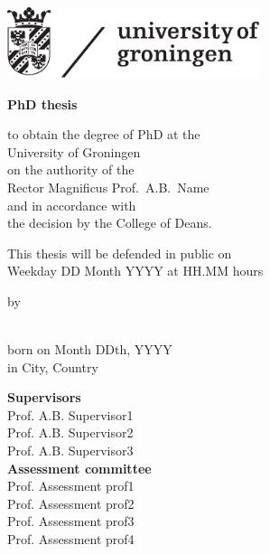 \thispagestyle{empty}

\begin{addmargin}[-1cm]{-3cm}
\includegraphics[width=7.38cm]{figures/rugr_logoen_zwart_cmyk}

\begin{center}

\large 

\vfill\vfill\vfill\vfill\vfill

{\Huge\textbf{\myTitle}}

\vfill

{\Large\mySubtitle}

\vfill\vfill\vfill\vfill\vfill

{\Large\textbf{PhD thesis}}

\vfill\vfill\vfill\vfill

to obtain the degree of PhD at the\\
University of Groningen\\
on the authority of the\\
Rector Magnificus Prof.\ A.B.~Name\\
and in accordance with\\
the decision by the College of Deans.

\vfill

This thesis will be defended in public on\\

\vfill
Weekday DD Month YYYY at HH.MM hours\\

\vfill\vfill\vfill\vfill

by

\vfill\vfill\vfill\vfill

{\Large\textbf{\myName}}\\

\vfill
born on Month DDth, YYYY\\
in City, Country 
\end{center}
\end{addmargin}

\newpage
\thispagestyle{empty}
{\large
\noindent\textbf{Supervisors}\\
Prof. A.B. Supervisor1\\
Prof. A.B. Supervisor2\\
Prof. A.B. Supervisor3\\

\noindent\textbf{Assessment committee}\\
Prof. Assessment prof1\\
Prof. Assessment prof2\\
Prof. Assessment prof3\\
Prof. Assessment prof4\\

\vfill
}
